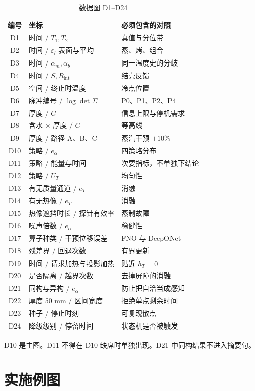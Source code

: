 \begin{table}[H]
\centering
\caption{数据图 D1--D24}
\begin{tabularx}{\textwidth}{clX}
\toprule
编号 & 坐标 & 必须包含的对照 \\
\midrule
D1 & 时间 / $T_1,T_2$ & 真值与分位带 \\
D2 & 时间 / $\varepsilon_l$ 表面与平均 & 蒸、烤、组合 \\
D3 & 时间 / $\alpha_m,\alpha_b$ & 同一温度史的分歧 \\
D4 & 时间 / $S,R_{\mathrm{int}}$ & 结壳反馈 \\
D5 & 空间 / 终止时温度 & 冷点位置 \\
D6 & 脉冲编号 / $\log\det\Sigma$ & P0、P1、P2、P4 \\
D7 & 厚度 / $G$ & 信息上限与停机需求 \\
D8 & 含水 $\times$ 厚度 / $G$ & 等高线 \\
D9 & 厚度 / 路径 A、B、C & 蒸汽干预 $+10\%$ \\
D10 & 策略 / $e_{\alpha}$ & 四策略分布 \\
D11 & 策略 / 能量与时间 & 次要指标，不单独下结论 \\
D12 & 策略 / $U_T$ & 均匀性 \\
D13 & 有无质量通道 / $e_T$ & 消融 \\
D14 & 有无热像 / $e_T$ & 消融 \\
D15 & 热像遮挡时长 / 探针有效率 & 蒸制故障 \\
D16 & 噪声倍数 / $e_{\alpha}$ & 稳健性 \\
D17 & 算子种类 / 干预位移误差 & FNO 与 DeepONet \\
D18 & 残差界 / 回退次数 & 有界更新 \\
D19 & 时间 / 请求加热与投影加热 & 贴近 $h_T=0$ \\
D20 & 是否隔离 / 越界次数 & 去掉屏障的消融 \\
D21 & 同构与异构 / $e_{\alpha}$ & 防止把自洽当成感知 \\
D22 & 厚度 50 mm / 区间宽度 & 拒绝单点剩余时间 \\
D23 & 种子 / 停止时刻 & 可复现散点 \\
D24 & 降级级别 / 停留时间 & 状态机是否被触发 \\
\bottomrule
\end{tabularx}
\end{table}

D10 是主图。D11 不得在 D10 缺席时单独出现。D21 中同构结果不进入摘要句。

\section{实施例图}

